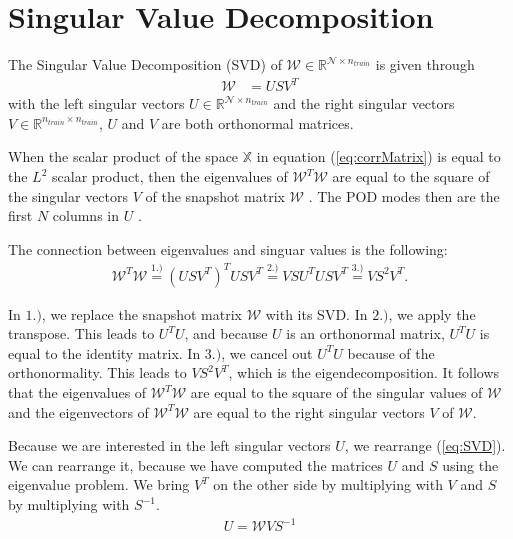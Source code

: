 \newpage
\section{Singular Value Decomposition}
\label{sec:SVD}
The Singular Value Decomposition (SVD) of $\mathcal{W} \in \mathbb{R}^{\mathcal{ N } \times n_{train}}$ is given through
\begin{align}
\label{eq:SVD}
\mathcal{W} &= U S V^{T} 
\end{align}
with the left singular vectors $U \in \mathbb{R}^{\mathcal{ N } \times n_{train}}$ and  the right singular vectors $V \in \mathbb{R}^{ n_{train} \times n_{train}}$, $U$ and $V$ are both orthonormal matrices. 

When the scalar product of the space $\mathbb{X}$ in equation (\ref{eq:corrMatrix}) is equal to the $L^2$ scalar product, then the eigenvalues of $ \mathcal{W}^T \mathcal{W} $ are equal to the square of the singular vectors  $V$ of the snapshot matrix $ \mathcal{W} $ \cite[Section 3.2.1, Linear algebra box]{HRSbook}.
The POD modes then are the first $N$ columns in $U$ \cite{parapod}.

The connection between eigenvalues and singuar values is the following:
\begin{align}
\label{eq:WWsvd}
\mathcal{W}^T \mathcal{W} \overset{1.)}{=} (USV^T)^T USV^T \overset{2.)}{=} VSU^T USV^T \overset{3.)}{=} V S^2 V^T.
\end{align}

In $1.)$, we replace the snapshot matrix $\mathcal{ W }$ with its SVD.
In $2.)$, we apply the transpose. This leads to $U^TU$, and because $U$ is an orthonormal matrix, $U^TU$ is equal to the identity matrix.
In $3.)$, we cancel out $U^TU$ because of the orthonormality. This leads to  $V S^2 V^T$, which is the eigendecomposition.
It follows that the eigenvalues of $\mathcal{W}^T \mathcal{W}$ are equal to the square of the singular values of $\mathcal{W}$ and the eigenvectors of $\mathcal{W}^T \mathcal{W}$  are equal to the right singular vectors $V$ of $ \mathcal{W} $. 

Because we are interested in the left singular vectors $U$, we rearrange (\ref{eq:SVD}).
We can rearrange it, because we have computed the matrices $U$ and $S$ using the eigenvalue problem.
We bring $V^T$ on the other side by multiplying with $V$ and $S$ by multiplying with $S^{-1}$.
\begin{align}
U = \mathcal{W}VS^{-1}
\end{align}





